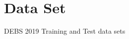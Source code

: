 \section{Data Set}



% 



% 











DEBS 2019 Training and Test data sets \cite{DEBSGC2019}


